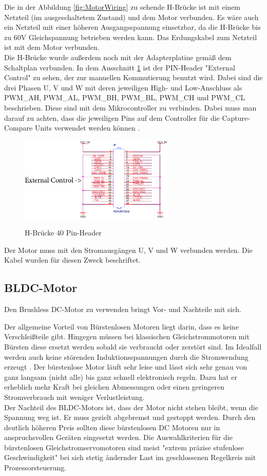 Die in der Abbildung \ref{fig:MotorWiring} zu sehende H-Brücke ist mit einem Netzteil (im ausgeschaltetem Zustand) und dem Motor verbunden. Es wäre auch ein Netzteil mit einer höheren Ausgangsspannung einsetzbar, da die H-Brücke bis zu 60V Gleichspannung betrieben werden kann. Das Erdungskabel zum Netzteil ist mit dem Motor verbunden. \\
Die H-Brücke wurde außerdem noch mit der Adapterplatine gemäß dem Schaltplan verbunden. In dem Ausschnitt \ref{fig:TIWiring} ist der PIN-Header "External Control" zu sehen, der zur manuellen Kommutierung benutzt wird. Dabei sind die drei Phasen U, V und W mit deren jeweiligen High- und Low-Anschluss als PWM\_AH, PWM\_AL, PWM\_BH, PWM\_BL, PWM\_CH und PWM\_CL beschrieben. Diese sind mit dem Mikrocontroller zu verbinden. Dabei muss man darauf zu achten, dass die jeweiligen Pins auf dem Controller für die Capture-Compare Units verwendet werden können \cite{InfineonTechnologies2016}.
\begin{figure}
    \includegraphics[width=0.66\textwidth]{motor/TI_Wiring.png}
    \caption{H-Brücke 40 Pin-Header}
    \quelle \cite{Instruments2014}
    \label{fig:TIWiring}
\end{figure}
Der Motor muss mit den Stromausgängen U, V und W verbunden werden. Die Kabel wurden für diesen Zweck beschriftet. \\

\subsection{BLDC-Motor}
Den Brushless DC-Motor zu verwenden bringt Vor- und Nachteile mit sich.

Der allgemeine Vorteil von Bürstenlosen Motoren liegt darin, dass es keine Verschleißteile gibt.
Hingegen müssen bei klassischen Gleichstrommotoren mit Bürsten diese ersetzt werden sobald sie verbraucht oder zerstört sind. Im Idealfall werden auch keine störenden Induktionsspannungen durch die Stromwendung erzeugt \cite{Babiel2014}. Der bürstenlose Motor läuft sehr leise und lässt sich sehr genau von ganz langsam (nicht alle) bis ganz schnell elektronisch regeln. Dazu hat er erheblich mehr Kraft bei gleichen Abmessungen oder einen geringeren Stromverbrauch mit weniger Verlustleistung. \\
Der Nachteil des BLDC-Motors ist, dass der Motor nicht stehen bleibt, wenn die Spannung weg ist. Er muss gezielt abgebremst und gestoppt werden.
Durch den deutlich höheren Preis sollten diese bürstenlosen DC Motoren nur in anspruchsvollen Geräten eingesetzt werden.
Die Auswahlkriterien für die bürstenlosen Gleichstromservomotoren sind meist "extrem präzise stufenlose Geschwindigkeit" bei sich stetig ändernder Last im geschlossenen Regelkreis mit Prozessorsteuerung.

